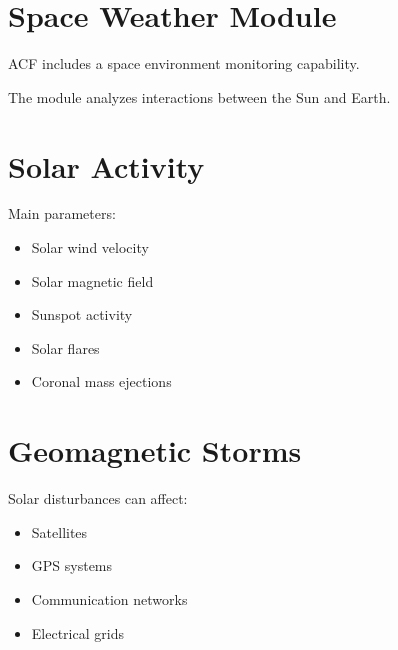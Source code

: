 \section{Space Weather Module}

ACF includes a space environment monitoring capability.

The module analyzes interactions between the Sun and Earth.



\section{Solar Activity}

Main parameters:

\begin{itemize}
\item Solar wind velocity
\item Solar magnetic field
\item Sunspot activity
\item Solar flares
\item Coronal mass ejections
\end{itemize}



\section{Geomagnetic Storms}

Solar disturbances can affect:

\begin{itemize}
\item Satellites
\item GPS systems
\item Communication networks
\item Electrical grids
\end{itemize}
